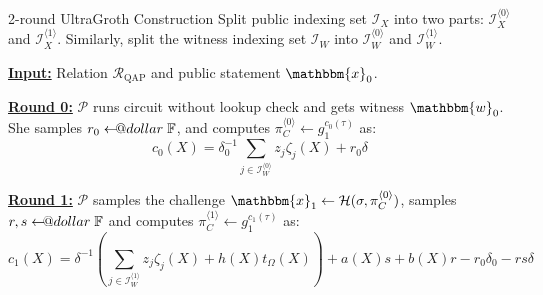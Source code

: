 \documentclass{zkdl-presentation-template}
\makeatletter
\newcommand\leftarrowS{\leftarrow\joinrel\smalldollar}
\newcommand{\smalldollar}{\mathrel{\mathpalette\small@dollar\relax}}
\newcommand{\small@dollar}[2]{%
  \vcenter{\hbox{%
    $#1\textnormal{\fontsize{0.7\dimexpr\f@size pt}{0}\selectfont\$}$%
  }}%
}
\makeatother
\begin{document}
    \begin{frame}{2-round UltraGroth Construction}
        Split public indexing set $\mathcal{I}_X$ into two parts:
        $\mathcal{I}_X^{\langle 0 \rangle}$ and $\mathcal{I}_X^{\langle 1
        \rangle}$. Similarly, split the witness indexing set $\mathcal{I}_W$
        into $\mathcal{I}_W^{\langle 0 \rangle}$ and $\mathcal{I}_W^{\langle 1
        \rangle}$.

        \underline{\textbf{Input:}} Relation $\mathcal{R}_{\text{QAP}}$ and public statement
        $\mathbbm{x}_0$.

        \underline{\textbf{Round 0:}} $\mathcal{P}$ runs circuit without lookup
        check and gets witness $\mathbbm{w}_0$. She samples $r_0 \leftarrowS
        \mathbb{F}$, and computes $\pi_C^{\langle 0 \rangle} \gets
        g_1^{c_0(\tau)}$ as:
        \begin{equation*}
            c_0(X) = \delta_0^{-1}\sum_{j \in \mathcal{I}_W^{\langle 0 \rangle}} z_j\zeta_j(X) + r_0\delta
        \end{equation*}

        \underline{\textbf{Round 1:}} $\mathcal{P}$ samples the challenge $\mathbbm{x}_1 \gets \mathcal{H}(\sigma,\pi_C^{\langle 0 \rangle})$,
        samples $r,s \leftarrowS \mathbb{F}$ and computes $\pi_C^{\langle 1 \rangle} \gets g_1^{c_1(\tau)}$ as:
        \begin{equation*}
            c_1(X) = \delta^{-1}\left(\sum_{j \in \mathcal{I}_W^{\langle 1 \rangle}} z_j\zeta_j(X)+h(X)t_{\Omega}(X)\right) + a(X)s + b(X)r - r_0\delta_0 - rs\delta
        \end{equation*}
    \end{frame}
\end{document}
